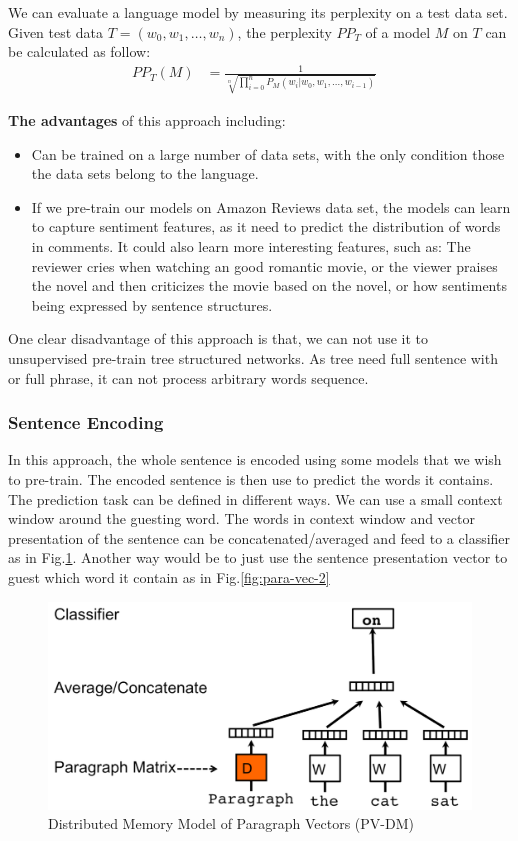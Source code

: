 We can evaluate a language model by measuring its perplexity on a test data set. Given test data \(T = (w_0, w_1,\ldots,w_n)\), the perplexity \(PP_T\) of a model \(M\) on \(T\) can be calculated as follow\cite{perplexity}:
\begin{align}
	PP_T(M) &= \frac{1}{\sqrt[n]{\prod_{i=0}^{n} P_M(w_{i}|w_0, w_1,\ldots,w_{i-1})}}&
\end{align}

\textbf{The advantages} of this approach including:
\begin{itemize}
\item Can be trained on a large number of data sets, with the only condition those the data sets belong to the language.
\item If we pre-train our models on Amazon Reviews data set, the models can learn to capture sentiment features, as it need to predict the distribution of words in comments.
It could also learn more interesting features, such as: 
The reviewer cries when watching an good romantic movie, or the viewer praises the novel and then criticizes the movie based on the novel, or how sentiments being expressed by sentence structures.  
\end{itemize}

One clear disadvantage of this approach is that, we can not use it to unsupervised pre-train tree structured networks. 
As tree need full sentence with or full phrase, it can not process arbitrary words sequence. 

\subsubsection{Sentence Encoding}
In this approach, the whole sentence is encoded using some models that we wish to pre-train. 
The encoded sentence is then use to predict the words it contains.  
The prediction task can be defined in different ways.
We can use a small context window around the guesting word.
The words in context window and vector presentation of the sentence can be concatenated/averaged and feed to a classifier as in Fig.\ref{fig:para-vec-1}.
Another way would be to just use the sentence presentation vector to guest which word it contain as in Fig.\ref{fig:para-vec-2}


\begin{figure}[H]
	\centering	\includegraphics[scale=0.3]{figure/para-vec-1}
	\caption{Distributed Memory Model of Paragraph Vectors (PV-DM)\cite{ParagraphVec}}
	\label{fig:para-vec-1}
\end{figure}

